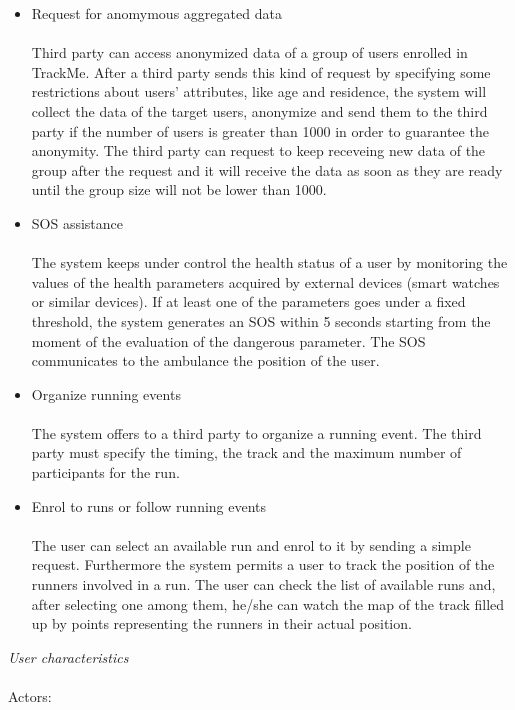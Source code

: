 \documentclass{article}
\begin{document}
\begin{legal}
\begin{legal}
{\begin{itemize}
		\item Request for anomymous aggregated data\\\\
		Third party can access anonymized data of a group of users enrolled in TrackMe. After a third party sends this kind of request by specifying some restrictions about users’ attributes, like age and residence, the system will collect the data of the target users, anonymize and send them to the third party if the number of users is greater than 1000 in order to guarantee the anonymity. The third party can request to keep receveing new data of the group after the request and it will receive the data as soon as they are ready until the group size will not be lower than 1000.\\
		\item SOS assistance\\\\
		The system keeps under control the health status of a user by monitoring the values of the health parameters acquired by external devices (smart watches or similar devices). If at least one of the parameters goes under a fixed threshold, the system generates an SOS within 5 seconds starting from the moment of the evaluation of the dangerous parameter. The SOS communicates to the ambulance the position of the user.\\
		\item Organize running events\\\\
		The system offers to a third party to organize a running event. The third party must specify the timing, the track and the maximum number of participants for the run.\\
		\item Enrol to runs or follow running events\\\\
		The user can select an available run and enrol to it by sending a simple request. Furthermore the system permits a user to track the position of the runners involved in a run. The user can check the list of available runs and, after selecting one among them, he/she can watch the map of the track filled up by points representing the runners in their actual position. \\
		\end{itemize}
		}
		\item \textit{User characteristics} \\\\
			{\normalfont
			Actors:\\
}
\end{legal}
\end{legal}
\end{document}

